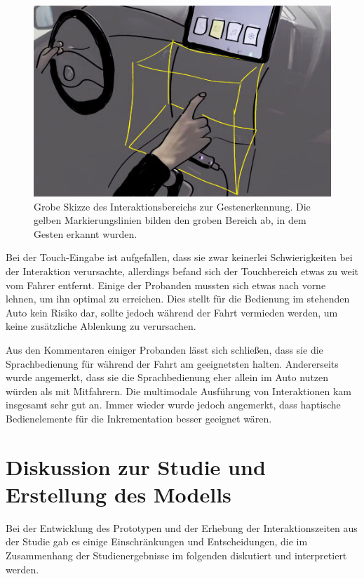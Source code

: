 \begin{figure}[ht]
	\centering
		\includegraphics[width=1\textwidth]{img/GestenbereichSkizze2.jpg}
	\caption[Skizze des Interaktionsbereichs zur Gestenerkennung]{Grobe Skizze des Interaktionsbereichs zur Gestenerkennung. Die gelben Markierungslinien bilden den groben Bereich ab, in dem Gesten erkannt wurden.}
	\label{fig:GestenbereichSkizze}
\end{figure}

Bei der Touch-Eingabe ist aufgefallen, dass sie zwar keinerlei Schwierigkeiten bei der Interaktion verursachte, allerdings befand sich der Touchbereich etwas zu weit vom Fahrer entfernt.
Einige der Probanden mussten sich etwas nach vorne lehnen, um ihn optimal zu erreichen.
Dies stellt für die Bedienung im stehenden Auto kein Risiko dar, sollte jedoch während der Fahrt vermieden werden, um keine zusätzliche Ablenkung zu verursachen.

Aus den Kommentaren einiger Probanden lässt sich schließen, dass sie die Sprachbedienung für während der Fahrt am geeignetsten halten.
Andererseits wurde angemerkt, dass sie die Sprachbedienung eher allein im Auto nutzen würden als mit Mitfahrern.
Die multimodale Ausführung von Interaktionen kam insgesamt sehr gut an.
Immer wieder wurde jedoch angemerkt, dass haptische Bedienelemente für die Inkrementation besser geeignet wären.

\clearpage
\section[Diskussion]{Diskussion zur Studie und Erstellung des Modells}
Bei der Entwicklung des Prototypen und der Erhebung der Interaktionszeiten aus der Studie gab es einige Einschränkungen und Entscheidungen, die im Zusammenhang der Studienergebnisse im folgenden diskutiert und interpretiert werden.

